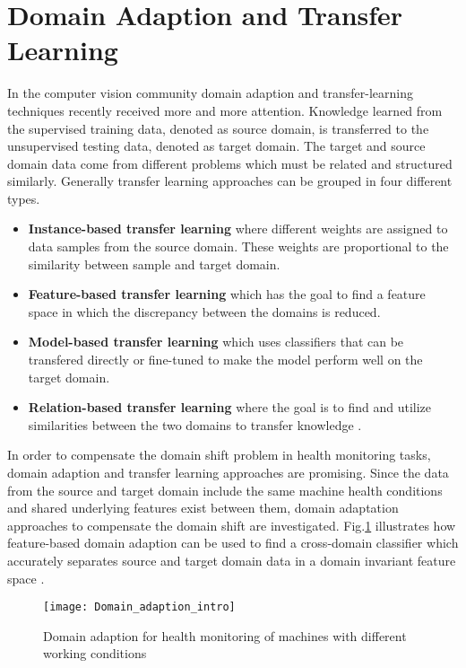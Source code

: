 \section{Domain Adaption and Transfer Learning}
In the computer vision community domain adaption and transfer-learning techniques recently received more and more attention. Knowledge learned from the supervised training data, denoted as source domain, is transferred to the unsupervised testing data, denoted as target domain. The target and source domain data come from different problems which must be related and structured similarly. Generally transfer learning approaches can be grouped in four different types. 

\begin{itemize}
\item \textbf{Instance-based transfer learning} where different weights are assigned to data samples from the source domain. These weights are proportional to the similarity between sample and target domain.
\item \textbf{Feature-based transfer learning} which has the goal to find a feature space in which the discrepancy between the domains is reduced.
\item \textbf{Model-based transfer learning} which uses classifiers that can be transfered directly or fine-tuned to make the model perform well on the target domain.
\item \textbf{Relation-based transfer learning} where the goal is to find and utilize similarities between the two domains to transfer knowledge \cite{AZAMFAR2020103932}. 
\end{itemize}

In order to compensate the domain shift problem in health monitoring tasks, domain adaption and transfer learning approaches are promising. Since the data from the source and target domain include the same machine health conditions and shared underlying features exist between them, domain adaptation approaches to compensate the domain shift are investigated. Fig.\ref{fig:Domain_adaption_intro} illustrates how feature-based domain adaption can be used to find a cross-domain classifier which accurately separates source and target domain data in a domain invariant feature space \cite{Pandhare2021}.

\begin{figure}[htpb]
  \centering
  \texttt{[image: Domain\_adaption\_intro]}
  \caption {Domain adaption for health monitoring of machines with different working conditions \cite{Pandhare2021}} \label{fig:Domain_adaption_intro}
\end{figure}
